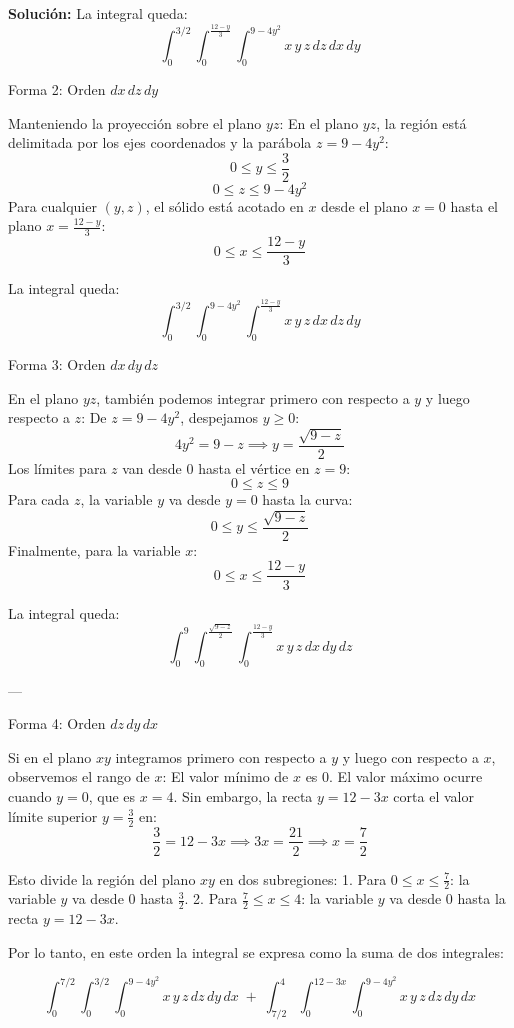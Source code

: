 \documentclass[12pt,a4paper]{report}
\newcommand{\solutionname}{Solución:}
\newenvironment{solution}{
 	\par\noindent\textbf{\color{structurecolor}\solutionname}
 	\color{black!90}}{\hfill\quad\par}
\begin{document}
\begin{solution}
La integral queda:
$$\int_{0}^{3/2} \int_{0}^{\frac{12 - y}{3}} \int_{0}^{9 - 4y^2} x\,y\,z\,dz\,dx\,dy$$



 Forma 2: Orden $dx\,dz\,dy$

Manteniendo la proyección sobre el plano $yz$:
 En el plano $yz$, la región está delimitada por los ejes coordenados y la parábola $z = 9 - 4y^2$:
  $$0 \le y \le \frac{3}{2}$$
  $$0 \le z \le 9 - 4y^2$$
 Para cualquier $(y, z)$, el sólido está acotado en $x$ desde el plano $x = 0$ hasta el plano $x = \frac{12 - y}{3}$:
  $$0 \le x \le \frac{12 - y}{3}$$

La integral queda:
$$\int_{0}^{3/2} \int_{0}^{9 - 4y^2} \int_{0}^{\frac{12 - y}{3}} x\,y\,z\,dx\,dz\,dy$$



 Forma 3: Orden $dx\,dy\,dz$

En el plano $yz$, también podemos integrar primero con respecto a $y$ y luego respecto a $z$:
 De $z = 9 - 4y^2$, despejamos $y \ge 0$:
  $$4y^2 = 9 - z \implies y = \frac{\sqrt{9 - z}}{2}$$
  Los límites para $z$ van desde $0$ hasta el vértice en $z = 9$:
  $$0 \le z \le 9$$
 Para cada $z$, la variable $y$ va desde $y = 0$ hasta la curva:
  $$0 \le y \le \frac{\sqrt{9 - z}}{2}$$
 Finalmente, para la variable $x$:
  $$0 \le x \le \frac{12 - y}{3}$$

La integral queda:
$$\int_{0}^{9} \int_{0}^{\frac{\sqrt{9 - z}}{2}} \int_{0}^{\frac{12 - y}{3}} x\,y\,z\,dx\,dy\,dz$$

---

 Forma 4: Orden $dz\,dy\,dx$

Si en el plano $xy$ integramos primero con respecto a $y$ y luego con respecto a $x$, observemos el rango de $x$:
 El valor mínimo de $x$ es $0$.
 El valor máximo ocurre cuando $y = 0$, que es $x = 4$.
 Sin embargo, la recta $y = 12 - 3x$ corta el valor límite superior $y = \frac{3}{2}$ en:
  $$\frac{3}{2} = 12 - 3x \implies 3x = \frac{21}{2} \implies x = \frac{7}{2}$$

Esto divide la región del plano $xy$ en dos subregiones:
1. Para $0 \le x \le \frac{7}{2}$: la variable $y$ va desde $0$ hasta $\frac{3}{2}$.
2. Para $\frac{7}{2} \le x \le 4$: la variable $y$ va desde $0$ hasta la recta $y = 12 - 3x$.

Por lo tanto, en este orden la integral se expresa como la suma de dos integrales:

$$\int_{0}^{7/2} \int_{0}^{3/2} \int_{0}^{9 - 4y^2} x\,y\,z\,dz\,dy\,dx \;+\; \int_{7/2}^{4} \int_{0}^{12 - 3x} \int_{0}^{9 - 4y^2} x\,y\,z\,dz\,dy\,dx$$

\end{solution}
\end{document}

